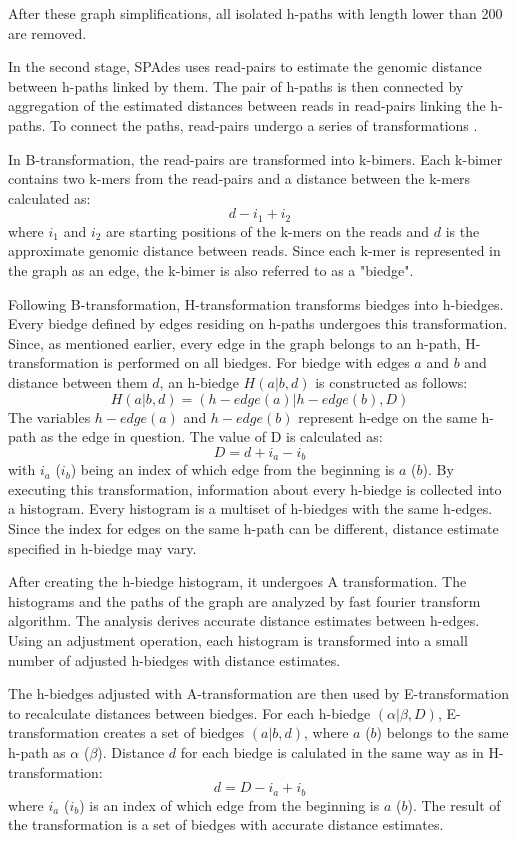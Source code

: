 After these graph simplifications, all isolated h-paths with length lower than 200 are removed.

In the second stage, SPAdes uses read-pairs to estimate the genomic distance between h-paths linked by them. The pair of h-paths is then connected by aggregation of the estimated distances between reads in read-pairs linking the h-paths. To connect the paths, read-pairs undergo a series of transformations \cite{bankevich2012spades}. 

In B-transformation, the read-pairs are transformed into k-bimers. Each k-bimer contains two k-mers from the read-pairs and a distance between the k-mers calculated as:
\[d - i_{1} + i_{2}\]
where $i_{1}$ and $i_{2}$ are starting positions of the k-mers on the reads and $d$ is the approximate genomic distance between reads. Since each k-mer is represented in the graph as an edge, the k-bimer is also referred to as a "biedge".

Following B-transformation, H-transformation transforms biedges into h-biedges. Every biedge defined by edges residing on h-paths undergoes this transformation. Since, as mentioned earlier, every edge in the graph belongs to an h-path, H-transformation is performed on all biedges. For biedge with edges $a$ and $b$ and distance between them $d$, an h-biedge $H(a|b,d)$ is constructed as follows:
\[ H(a|b,d) = (h-edge(a)|h-edge(b),D) \]
The variables $h-edge(a)$ and $h-edge(b)$ represent h-edge on the same h-path as the edge in question. The value of D is calculated as:
\[D = d + i_{a} - i_{b}\]
with $i_{a}$ ($i_{b}$) being an index of which edge from the beginning is $a$ ($b$). By executing this transformation, information about every h-biedge is collected into a histogram. Every histogram is a multiset of h-biedges with the same h-edges. Since the index for edges on the same h-path can be different, distance estimate specified in h-biedge may vary.

After creating the h-biedge histogram, it undergoes A transformation. The histograms and the paths of the graph are analyzed by fast fourier transform algorithm. The analysis derives accurate distance estimates between h-edges. Using an adjustment operation, each histogram is transformed into a small number of adjusted h-biedges with distance estimates.

The h-biedges adjusted with A-transformation are then used by E-transformation to recalculate distances between biedges. For each h-biedge $(\alpha|\beta,D)$, E-transformation creates a set of biedges $(a|b,d)$, where $a$ ($b$) belongs to the same h-path as $\alpha$ ($\beta$). Distance $d$ for each biedge is calulated in the same way as in H-transformation:
\[ d = D - i_{a} + i_{b} \]
where $i_{a}$ ($i_{b}$) is an index of which edge from the beginning is $a$ ($b$). The result of the transformation is a set of biedges with accurate distance estimates.

